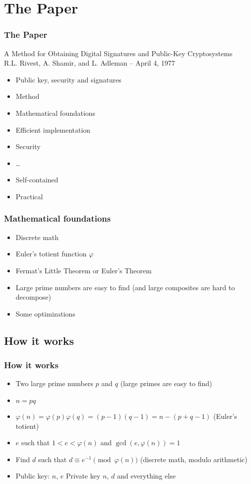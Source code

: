 \documentclass{beamer}
\begin{document}
\section{The Paper}

\begin{frame}
	\frametitle{The Paper}
		A Method for Obtaining Digital Signatures and Public-Key Cryptosystems \\
		R.L. Rivest, A. Shamir, and L. Adleman -- April 4, 1977
		\begin{itemize}
			\item Public key, security and signatures
			\item Method
			\item Mathematical foundations
			\item Efficient implementation
			\item Security
			\item \ldots
			\item Self-contained
			\item Practical
		\end{itemize}
\end{frame}

\begin{frame}
	\frametitle{Mathematical foundations}
	\begin{itemize}
		\item Discrete math
		\item Euler's totient function $\varphi$
		\item Fermat's Little Theorem or Euler's Theorem
		\item Large prime numbers are easy to find (and large
		      composites are hard to decompose)
		\item Some optimizations
	\end{itemize}
\end{frame}

\subsection{How it works}

\begin{frame}
	\frametitle{How it works}
	\begin{itemize}
		\item Two large prime numbers $p$ and $q$ (large primes are
                      easy to find)
		\item $n = pq$
		\item $\varphi(n) = \varphi(p)\varphi(q) = (p-1)(q-1) = n - (p + q -1)$
		      (Euler's totient)
		\item $e$ such that $1 < e < \varphi(n)$ and $\gcd(e, \varphi(n)) = 1$
		\item Find $d$ such that $d \equiv e^{-1} \pmod{\varphi(n)}$
		      (discrete math, modulo arithmetic)
		\item Public key: $n$, $e$ Private key $n$, $d$ and everything else
	\end{itemize}
\end{frame}
\end{document}
